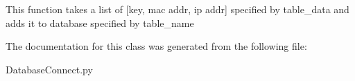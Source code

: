 \begin{DoxyVerb}This function takes a list of [key, mac addr, ip addr] specified by table_data and adds it to database specified by table_name\end{DoxyVerb}
 

The documentation for this class was generated from the following file\+:\begin{DoxyCompactItemize}
\item 
Database\+Connect.\+py\end{DoxyCompactItemize}

